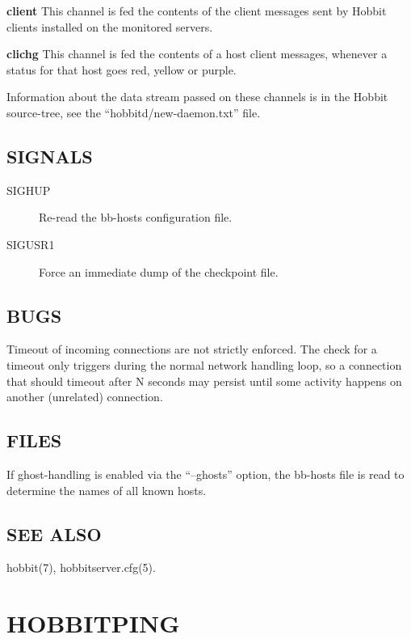  \textbf{client}
 This channel is fed the contents of the client messages sent by Hobbit clients installed on the monitored servers. 


 \textbf{clichg}
 This channel is fed the contents of a host client messages, whenever a status for that host goes red, yellow or purple. 


  Information about the data stream passed on these channels is in the Hobbit source-tree, see the ``hobbitd/new-daemon.txt'' file. 


 
\subsection{SIGNALS}
\begin{description}
\item[SIGHUP] Re-read the bb-hosts configuration file. 

 

\item[SIGUSR1] Force an immediate dump of the checkpoint file. 

 


\end{description}
\subsection{BUGS}
 Timeout of incoming connections are not strictly enforced. The check for a timeout only triggers during the normal network handling loop, so a connection that should timeout after N seconds may persist until some activity happens on another (unrelated) connection. 

 
\subsection{FILES}
 If ghost-handling is enabled via the ``--ghosts'' option, the bb-hosts file is read to determine the names of all known hosts. 

 
\subsection{SEE ALSO}
hobbit(7), hobbitserver.cfg(5). 
  

%
\newpage
\section{HOBBITPING}

